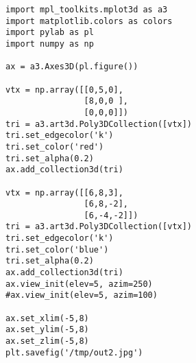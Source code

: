 
\begin{verbatim}
import mpl_toolkits.mplot3d as a3
import matplotlib.colors as colors
import pylab as pl
import numpy as np

ax = a3.Axes3D(pl.figure())

vtx = np.array([[0,5,0],
                [8,0,0 ],
                [0,0,0]])
tri = a3.art3d.Poly3DCollection([vtx])
tri.set_edgecolor('k')
tri.set_color('red')
tri.set_alpha(0.2)
ax.add_collection3d(tri)

vtx = np.array([[6,8,3],
                [6,8,-2],
                [6,-4,-2]])
tri = a3.art3d.Poly3DCollection([vtx])
tri.set_edgecolor('k')
tri.set_color('blue')
tri.set_alpha(0.2)
ax.add_collection3d(tri)
ax.view_init(elev=5, azim=250)
#ax.view_init(elev=5, azim=100)

ax.set_xlim(-5,8)
ax.set_ylim(-5,8)
ax.set_zlim(-5,8)
plt.savefig('/tmp/out2.jpg')
\end{verbatim}

















